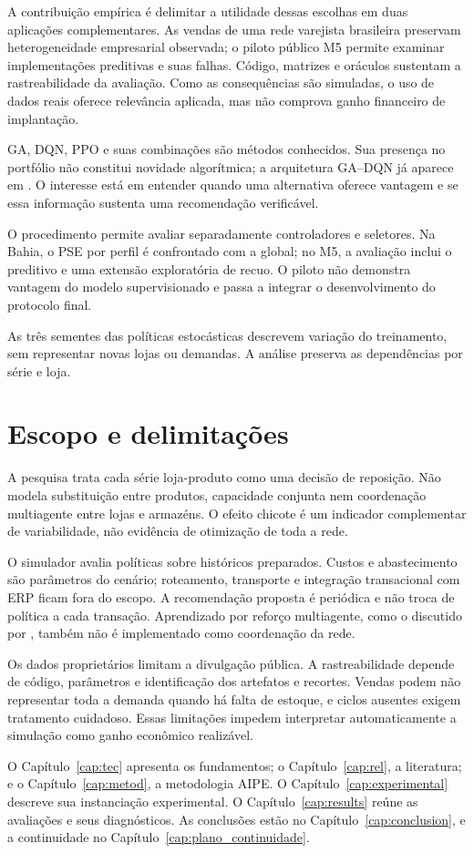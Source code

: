 A contribuição empírica é delimitar a utilidade dessas escolhas em duas aplicações complementares. As vendas de uma rede varejista brasileira preservam heterogeneidade empresarial observada; o piloto público M5 permite examinar implementações preditivas e suas falhas. Código, matrizes e oráculos sustentam a rastreabilidade da avaliação. Como as consequências são simuladas, o uso de dados reais oferece relevância aplicada, mas não comprova ganho financeiro de implantação.

GA, DQN, PPO e suas combinações são métodos conhecidos. Sua presença no portfólio não constitui novidade algorítmica; a arquitetura GA--DQN já aparece em \citet{Zabraoui2025GaDQN}. O interesse está em entender quando uma alternativa oferece vantagem e se essa informação sustenta uma recomendação verificável.

O procedimento permite avaliar separadamente controladores e seletores. Na Bahia, o PSE por perfil é confrontado com a global; no M5, a avaliação inclui o preditivo e uma extensão exploratória de recuo. O piloto não demonstra vantagem do modelo supervisionado e passa a integrar o desenvolvimento do protocolo final.

As três sementes das políticas estocásticas descrevem variação do treinamento, sem representar novas lojas ou demandas. A análise preserva as dependências por série e loja.

\section{Escopo e delimitações}
\label{sec:delimitacoes}

A pesquisa trata cada série loja-produto como uma decisão de reposição. Não modela substituição entre produtos, capacidade conjunta nem coordenação multiagente entre lojas e armazéns. O efeito chicote é um indicador complementar de variabilidade, não evidência de otimização de toda a rede.

O simulador avalia políticas sobre históricos preparados. Custos e abastecimento são parâmetros do cenário; roteamento, transporte e integração transacional com ERP ficam fora do escopo. A recomendação proposta é periódica e não troca de política a cada transação. Aprendizado por reforço multiagente, como o discutido por \citet{Liu2024HAPPO}, também não é implementado como coordenação da rede.

Os dados proprietários limitam a divulgação pública. A rastreabilidade depende de código, parâmetros e identificação dos artefatos e recortes. Vendas podem não representar toda a demanda quando há falta de estoque, e ciclos ausentes exigem tratamento cuidadoso. Essas limitações impedem interpretar automaticamente a simulação como ganho econômico realizável.

O Capítulo~\ref{cap:tec} apresenta os fundamentos; o Capítulo~\ref{cap:rel}, a literatura; e o Capítulo~\ref{cap:metod}, a metodologia AIPE. O Capítulo~\ref{cap:experimental} descreve sua instanciação experimental. O Capítulo~\ref{cap:results} reúne as avaliações e seus diagnósticos. As conclusões estão no Capítulo~\ref{cap:conclusion}, e a continuidade no Capítulo~\ref{cap:plano_continuidade}.

\newpage\lhead{\rightmark}
